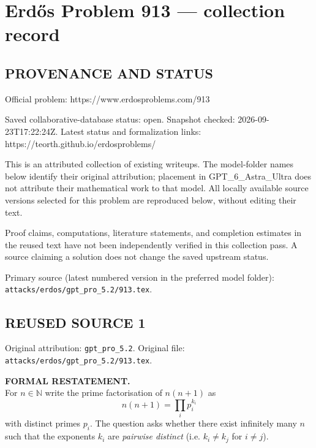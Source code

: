 \section*{Erd\H{o}s Problem 913 --- collection record}

\subsection*{PROVENANCE AND STATUS}
Official problem: https://www.erdosproblems.com/913

Saved collaborative-database status: open.
Snapshot checked: 2026-09-23T17:22:24Z.
Latest status and formalization links: https://teorth.github.io/erdosproblems/

This is an attributed collection of existing writeups. The model-folder names below identify their original attribution; placement in GPT\_6\_Astra\_Ultra does not attribute their mathematical work to that model. All locally available source versions selected for this problem are reproduced below, without editing their text.

Proof claims, computations, literature statements, and completion estimates in the reused text have not been independently verified in this collection pass. A source claiming a solution does not change the saved upstream status.

Primary source (latest numbered version in the preferred model folder): \texttt{attacks/erdos/gpt\_pro\_5.2/913.tex}.

\subsection*{REUSED SOURCE 1}
Original attribution: \texttt{gpt\_pro\_5.2}.
Original file: \texttt{attacks/erdos/gpt\_pro\_5.2/913.tex}.


\noindent\textbf{FORMAL RESTATEMENT.}\\
For $n\in\mathbb{N}$ write the prime factorisation of $n(n+1)$ as
\[
 n(n+1) = \prod_i p_i^{k_i}
\]
with distinct primes $p_i$. The question asks whether there exist infinitely many $n$ such that the exponents $k_i$ are \emph{pairwise distinct} (i.e. $k_i\ne k_j$ for $i\ne j$).

